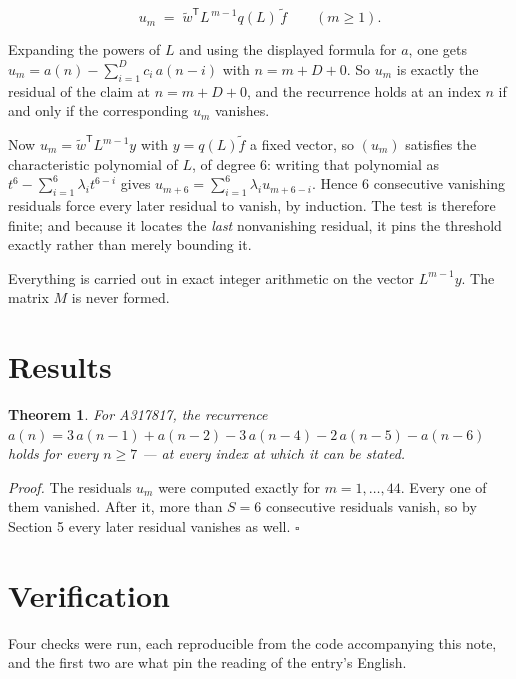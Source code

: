 \documentclass[11pt]{article}
\newtheorem{theorem}{Theorem}
\theoremstyle{definition}
\begin{document}
\[u_m \;=\; \tilde w^{\mathsf T} L^{\,m-1} q(L)\,\tilde f \qquad (m \ge 1).\]

Expanding the powers of $L$ and using the displayed formula for $a$, one gets $u_m = a(n) - \sum_{i=1}^{D} c_i\,a(n-i)$ with $n = m + D + 0$. So $u_m$ is exactly the residual of the claim at $n = m + D + 0$, and the recurrence holds at an index $n$ if and only if the corresponding $u_m$ vanishes.

Now $u_m = \tilde w^{\mathsf T} L^{m-1} y$ with $y = q(L)\tilde f$ a fixed vector, so $(u_m)$ satisfies the characteristic polynomial of $L$, of degree $6$: writing that polynomial as $t^{6} - \sum_{i=1}^{6} \lambda_i t^{6-i}$ gives $u_{m+6} = \sum_{i=1}^{6} \lambda_i u_{m+6-i}$. Hence $6$ consecutive vanishing residuals force every later residual to vanish, by induction. The test is therefore finite; and because it locates the {\itshape last} nonvanishing residual, it pins the threshold exactly rather than merely bounding it.

Everything is carried out in exact integer arithmetic on the vector $L^{m-1}y$. The matrix $M$ is never formed.

\section{Results}

\begin{theorem} For A317817, the recurrence $a(n) = 3\,a(n-1) + a(n-2) - 3\,a(n-4) - 2\,a(n-5) - a(n-6)$ holds for every $n \ge 7$ --- at every index at which it can be stated.\end{theorem}

{\itshape Proof.} The residuals $u_m$ were computed exactly for $m = 1,\dots,44$. Every one of them vanished. After it, more than $S = 6$ consecutive residuals vanish, so by Section 5 every later residual vanishes as well. $\square$

\section{Verification}

Four checks were run, each reproducible from the code accompanying this note, and the first two are what pin the reading of the entry's English.
\end{document}
